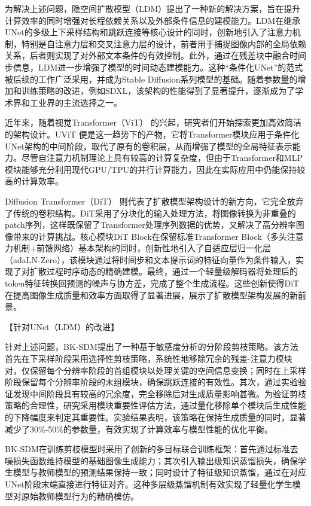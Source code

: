 \documentclass[11pt,a4paper,UTF8]{ctexart}
\begin{document}
为解决上述问题，隐空间扩散模型（LDM）\cite{rombach2022high}提出了一种新的解决方案，旨在提升计算效率的同时增强对长程依赖关系以及外部条件信息的建模能力。LDM在继承UNet的多级上下采样结构和跳跃连接等核心设计的同时，创新地引入了注意力机制，特别是自注意力层和交叉注意力层的设计，前者用于捕捉图像内部的全局依赖关系，后者则实现了对外部文本条件的有效控制。此外，通过在残差块中融合时间步信息，LDM进一步增强了模型的时间动态建模能力。这种“条件化UNet”的范式被后续的工作广泛采用，并成为Stable Diffusion系列模型的基础。随着参数量的增加和训练策略的改进，例如SDXL\cite{podell2023sdxl}，该架构的性能得到了显著提升，逐渐成为了学术界和工业界的主流选择之一。

近年来，随着视觉Transformer（ViT）\cite{dosovitskiy2020image} 的兴起，研究者们开始探索更加高效简洁的架构设计。UViT\cite{uvit} 便是这一趋势下的产物，它将Transformer模块应用于条件化UNet架构的中间阶段，取代了原有的卷积层，从而增强了模型的全局特征表示能力。尽管自注意力机制理论上具有较高的计算复杂度，但由于Transformer和MLP模块能够充分利用现代GPU/TPU的并行计算能力，因此在实际应用中仍能保持较高的计算效率。

Diffusion Transformer（DiT）\cite{peebles2022scalable} 则代表了扩散模型架构设计的新方向，它完全放弃了传统的卷积结构。DiT采用了分块化的输入处理方法，将图像转换为非重叠的patch序列，这样既保留了Transformer处理序列数据的优势，又解决了高分辨率图像带来的计算挑战。核心模块DiT Block在保留标准Transformer Block（多头注意力机制+前馈网络）基本架构的同时，创新性地引入了自适应层归一化层（adaLN-Zero），该模块通过将时间步和文本提示词的特征向量作为条件输入，实现了对扩散过程时序动态的精确建模。最终，通过一个轻量级解码器将处理后的token特征转换回预测的噪声与协方差，完成了整个生成流程。这些创新使得DiT在提高图像生成质量和效率方面取得了显著进展，展示了扩散模型架构发展的新前景。
\fi


【针对UNet（LDM）的改进】

针对上述问题，BK-SDM\cite{kim2023bk}提出了一种基于敏感度分析的分阶段剪枝策略。该方法首先在下采样阶段采用选择性剪枝策略，系统性地移除冗余的残差-注意力模块对，仅保留每个分辨率阶段的首组模块以处理关键的空间信息变换；同时在上采样阶段保留每个分辨率阶段的末组模块，确保跳跃连接的有效性。其次，通过实验验证发现中间阶段具有较高的冗余度，完全移除后对生成质量影响甚微。为验证剪枝策略的合理性，研究采用模块重要性评估方法，通过量化移除单个模块后生成性能的下降幅度来判定其重要性。实验结果表明，该策略在保持生成质量的同时，显著减少了30\%-50\%的参数量，有效实现了计算效率与模型性能的优化平衡。

BK-SDM\cite{kim2023bk}在训练剪枝模型时采用了创新的多目标联合训练框架：首先通过标准去噪损失函数维持模型的基础图像生成能力；其次引入输出级知识蒸馏损失，确保学生模型与教师模型的预测结果保持一致；同时设计了特征级知识蒸馏，通过在对应UNet阶段末端直接进行特征对齐。这种多层级蒸馏机制有效实现了轻量化学生模型对原始教师模型行为的精确模仿。
\end{document}
